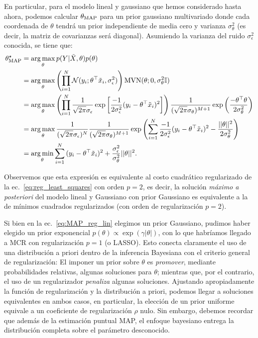 \begin{mdframed}[style=ejemplo, frametitle={\center Ejemplo: máximo a posterior para el modelo lineal y gaussiano}]
En particular, para el modelo lineal y gaussiano que hemos considerado hasta ahora, podemos calcular $\theta_\text{MAP}$ para un prior gaussiano multivariado donde cada coordenada de $\theta$ tendrá un prior independiente de media cero y varianza $\sigma_\theta^2$ (es decir, la matriz de covarianzas será diagonal). Asumiendo la varianza del ruido $\sigma_\epsilon^2$ conocida, se tiene que:	
\begin{align}
	\theta_\text{MAP}^\star 	&= \operatorname*{arg\,max}_\theta p(Y|\tilde{X},\theta)p(\theta)\nonumber\\
	&= \operatorname*{arg\,max}_\theta \left(\prod_{i=1}^N {\mathcal N}(y_i;\theta^\top\tilde{x}_i,\sigma_\epsilon^2)\right)\text{MVN}(\theta;0,\sigma_\theta^2{\mathbb I}) \nonumber\\
	&= \operatorname*{arg\,max}_\theta \left(\prod_{i=1}^N \frac{1}{\sqrt{2\pi}\sigma_\epsilon} \exp\left[{\frac{-1}{2\sigma_\epsilon^2}(y_i-\theta^\top\tilde{x}_i)^2}\right]\right)									\frac{1}{(\sqrt{2\pi}\sigma_\theta)^{M+1}} \exp\left({\frac{-\theta^\top\theta}{2\sigma_\theta^2}}\right) \nonumber\\
	&= \operatorname*{arg\,max}_\theta  \frac{1}{(\sqrt{2\pi}\sigma_\epsilon)^N} \frac{1}{(\sqrt{2\pi}\sigma_\theta)^{M+1}} \exp\left( \sum_{i=1}^N{\frac{-1}{2\sigma_\epsilon^2}(y_i-\theta^\top\tilde{x}_i)^2} -{\frac{||\theta||^2}{2\sigma_\theta^2}}\right) \nonumber\\
	&= \operatorname*{arg\,min}_\theta \sum_{i=1}^N{(y_i-\theta^\top\tilde{x}_i)^2} +{\frac{\sigma_\epsilon^2}{\sigma_\theta^2}||\theta||^2}.\label{eq:MAP_reg_lin}
\end{align}

Observemos que esta expresión es equivalente al costo cuadrático regularizado de la ec.~\eqref{eq:reg_least_squares} con orden $p=2$, es decir, la solución \emph{máximo a posteriori} del modelo lineal y Gaussiano con prior Gaussiano es equivalente a la de mínimos cuadrados regularizados (con orden de  regularización $p=2$). 

\end{mdframed}

Si bien en la ec.~\eqref{eq:MAP_reg_lin} elegimos un prior Gaussiano, pudimos haber elegido un prior exponencial $p(\theta)\propto\exp(\gamma|\theta|)$, con lo que habríamos llegado a MCR con regularización $p=1$ (o LASSO). Esto conecta claramente el uso de una distribución a priori dentro de la inferencia Bayesiana con el criterio general de regularización: El imponer un prior sobre $\theta$ es \emph{promover}, mediante probabilidades relativas, algunas soluciones para $\theta$; mientras que, por el contrario, el uso de un regularizador \emph{penaliza} algunas soluciones. Ajustando apropiadamente la función de regularización y la distribución a priori, podemos llegar a soluciones equivalentes en ambos casos, en particular, la elección de un prior uniforme equivale a un coeficiente de regularización $\rho$ nulo. Sin embargo, debemos recordar que además de la estimación puntual MAP, el enfoque bayesiano entrega la distribución completa sobre el parámetro desconocido. \\ 

